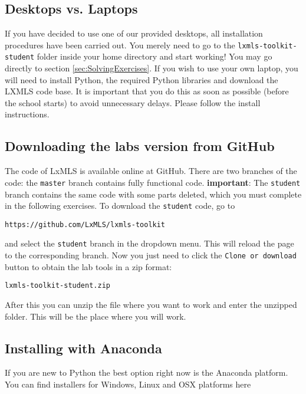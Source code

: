 \subsection{Desktops vs. Laptops}

If you have decided to use one of our provided desktops, all installation procedures have been carried out. You merely need to go to the \verb+lxmls-toolkit-student+ folder inside your home directory and start working! You may go directly to section \ref{sec:SolvingExercises}. If you wish to use your own laptop, you will need to install Python, the required Python libraries and download the LXMLS code base. It is important that you do this as soon as possible (before the school starts) to avoid unnecessary delays. Please follow the install instructions. 

\subsection{Downloading the labs version from GitHub}

The code of LxMLS is available online at GitHub. There are two branches of the code: the \verb+master+ branch contains fully functional code. \textbf{important}: The \verb+student+ branch contains the same code with some parts deleted, which you must complete in the following exercises. To download the \verb+student+ code, go to

\begin{verbatim}
https://github.com/LxMLS/lxmls-toolkit
\end{verbatim}

\noindent and select the \verb+student+ branch in the dropdown menu. This will reload the page to the corresponding branch. Now you just need to click the \verb+Clone or download + button to obtain the lab tools in a zip format:

\begin{verbatim}
lxmls-toolkit-student.zip
\end{verbatim}

After this you can unzip the file where you want to work and enter the unzipped folder. This will be the place where you will work. 

\subsection{Installing with Anaconda}

If you are new to Python the best option right now is the Anaconda platform. You can find installers for Windows, Linux and OSX platforms here

